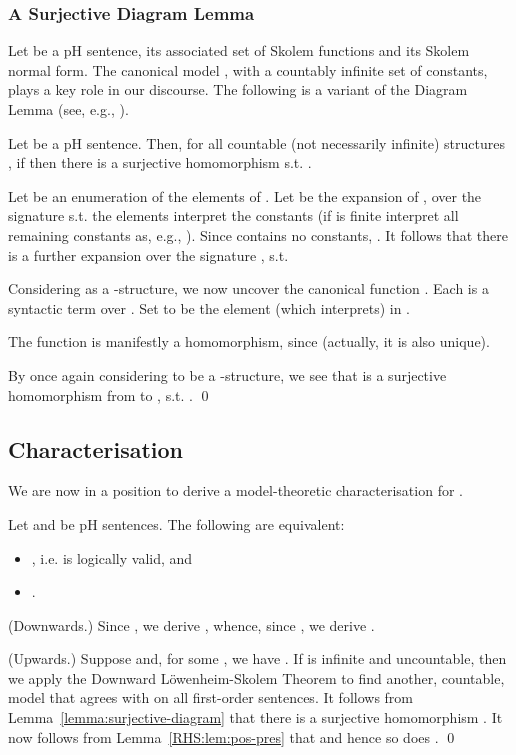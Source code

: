 \documentclass{LMCS}
\begin{document}
\subsubsection{A Surjective Diagram Lemma}

Let  be a pH sentence,  its associated set of Skolem functions and  its Skolem normal form. The canonical model , with a countably infinite set of constants, plays a key role in our discourse.
The following is a variant of the Diagram Lemma (see, e.g., \cite{Hodges}).
\begin{lem}
\label{lemma:surjective-diagram}
Let  be a pH sentence. Then, for all countable (not necessarily infinite) structures , if  then there is a surjective homomorphism  s.t. .
\end{lem}
\proof
Let  be an enumeration of the elements of . Let  be the expansion of , over the signature  s.t. the elements  interpret the constants  (if  is finite interpret all remaining constants as, e.g., ). Since  contains no constants, . It follows that there is a further expansion  over the signature , s.t. 

Considering  as a -structure, we now uncover the canonical function . Each  is a syntactic term over . Set  to be the element (which interprets)  in .

The function  is manifestly a homomorphism, since  (actually, it is also unique).  

By once again considering  to be a -structure, we see that  is a surjective homomorphism from  to , s.t. .
\qed

\subsection{Characterisation}
\label{LHS:sec:characterisation}

We are now in a position to derive a model-theoretic characterisation for .
\begin{thm}\label{thm:methodology}
Let  and  be pH sentences. The following are equivalent:
\begin{itemize}
\item[] , i.e.  is logically valid, and
\item[] .
\end{itemize}
\end{thm}
\proof
(Downwards.) Since , we derive , whence, since , we derive .

(Upwards.) Suppose  and, for some , we have . If  is infinite and uncountable, then we apply the  Downward L\"{o}wenheim-Skolem Theorem to find another, countable, model  that agrees with  on all first-order sentences. It follows from Lemma~\ref{lemma:surjective-diagram} that there is a surjective homomorphism . It now follows from  Lemma~\ref{RHS:lem:pos-pres} that  and hence so does .
\qed
\end{document}
